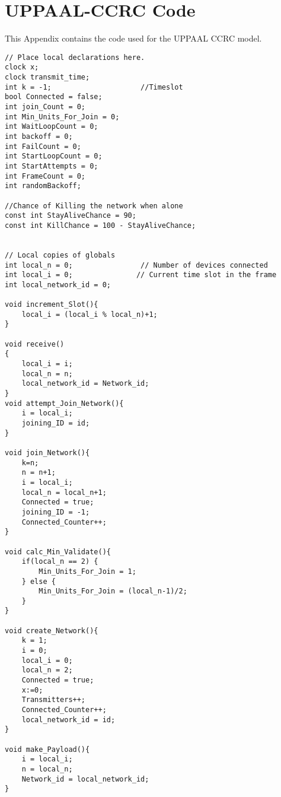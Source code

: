 \chapter{UPPAAL-CCRC Code}\label{UPPAAL-CCRC-Code}
This Appendix contains the code used for the UPPAAL CCRC model.

\begin{lstlisting}[style=UPPAAL,
caption={Local code for Device in CCUC.}, ]
// Place local declarations here.
clock x;
clock transmit_time;
int k = -1;                     //Timeslot
bool Connected = false;
int join_Count = 0;      
int Min_Units_For_Join = 0;
int WaitLoopCount = 0;
int backoff = 0;
int FailCount = 0;
int StartLoopCount = 0;
int StartAttempts = 0;
int FrameCount = 0;
int randomBackoff;

//Chance of Killing the network when alone
const int StayAliveChance = 90;
const int KillChance = 100 - StayAliveChance;


// Local copies of globals
int local_n = 0;                // Number of devices connected
int local_i = 0;               // Current time slot in the frame
int local_network_id = 0;

void increment_Slot(){
    local_i = (local_i % local_n)+1;
}

void receive()
{
    local_i = i;
    local_n = n;
    local_network_id = Network_id;
}
void attempt_Join_Network(){
    i = local_i;
    joining_ID = id;
}

void join_Network(){
    k=n;
    n = n+1;
    i = local_i;
    local_n = local_n+1;
    Connected = true;
    joining_ID = -1;
    Connected_Counter++;
}

void calc_Min_Validate(){
    if(local_n == 2) {
        Min_Units_For_Join = 1;
    } else {
        Min_Units_For_Join = (local_n-1)/2;
    }
}

void create_Network(){
    k = 1;
    i = 0;
    local_i = 0;
    local_n = 2;
    Connected = true;
    x:=0;
    Transmitters++;
    Connected_Counter++;
    local_network_id = id;
}

void make_Payload(){
    i = local_i;
    n = local_n;
    Network_id = local_network_id;
}

\end{lstlisting}

